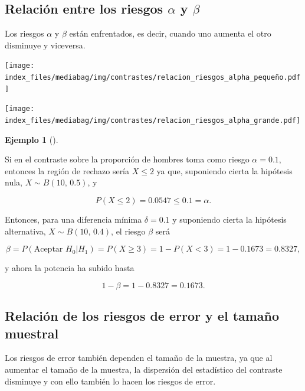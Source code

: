 \documentclass[
  a4paper,
]{scrreport}
\theoremstyle{plain}
\theoremstyle{definition}
\newtheorem{example}{Ejemplo}[chapter]
\theoremstyle{definition}
\theoremstyle{remark}
\begin{document}
\subsection{\texorpdfstring{Relación entre los riesgos \(\alpha\) y
\(\beta\)}{Relación entre los riesgos \textbackslash alpha y \textbackslash beta}}\label{relaciuxf3n-entre-los-riesgos-alpha-y-beta}

Los riesgos \(\alpha\) y \(\beta\) están enfrentados, es decir, cuando
uno aumenta el otro disminuye y viceversa.

\begin{center}
\texttt{[image: index\_files/mediabag/img/contrastes/relacion\_riesgos\_alpha\_pequeño.pdf]}
\end{center}

\begin{center}
\texttt{[image: index\_files/mediabag/img/contrastes/relacion\_riesgos\_alpha\_grande.pdf]}
\end{center}

\begin{example}[]\protect\hypertarget{exm-relacion-riesgos-alfa-beta}{}\label{exm-relacion-riesgos-alfa-beta}

Si en el contraste sobre la proporción de hombres toma como riesgo
\(\alpha=0.1,\) entonces la región de rechazo sería \(X\leq 2\) ya que,
suponiendo cierta la hipótesis nula, \(X\sim B(10,\, 0.5)\), y

\[P(X\leq 2) = 0.0547 \leq 0.1=\alpha.\]

Entonces, para una diferencia mínima \(\delta=0.1\) y suponiendo cierta
la hipótesis alternativa, \(X\sim B(10,\,0.4)\), el riesgo \(\beta\)
será

\[\beta = P(\mbox{Aceptar }H_0|H_1) = P(X\geq 3) = 1- P(X<3) = 1-0.1673 = 0.8327,\]

y ahora la potencia ha subido hasta

\[1-\beta = 1-0.8327 = 0.1673.\]

\end{example}

\subsection{Relación de los riesgos de error y el tamaño
muestral}\label{relaciuxf3n-de-los-riesgos-de-error-y-el-tamauxf1o-muestral}

Los riesgos de error también dependen el tamaño de la muestra, ya que al
aumentar el tamaño de la muestra, la dispersión del estadístico del
contraste disminuye y con ello también lo hacen los riesgos de error.
\end{document}
